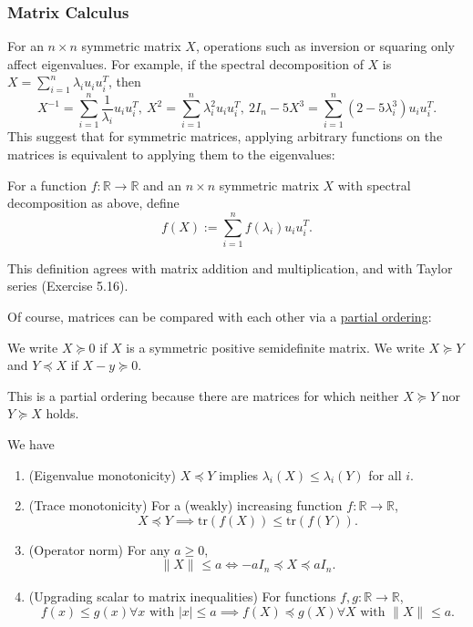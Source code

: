 \subsubsection{Matrix Calculus}
For an $n \times n$ symmetric matrix $X$, operations such as inversion or squaring only affect eigenvalues. 
For example, if the spectral decomposition of $X$ is $X = \sum_{i = 1}^{n} \lambda_i u_iu_i^T$, then
\[ X^{-1} = \sum_{i = 1}^{n} \frac{1}{\lambda_i}u_iu_i^T, \ 
X^2 = \sum_{i = 1}^{n} \lambda_i^2 u_iu_i^T, \ 
2I_n - 5X^3 = \sum_{i = 1}^{n} (2 - 5 \lambda_i^3)u_iu_i^T. \]
This suggest that for symmetric matrices, applying arbitrary functions on the matrices is equivalent to 
applying them to the eigenvalues:

\begin{definition}
\label{def:5.4.2}
For a function $f: \mathbb{R} \to \mathbb{R}$ and an $n \times n$ symmetric matrix $X$ with spectral 
decomposition as above, define 
\[ f(X) := \sum_{i = 1}^{n} f(\lambda_i)u_iu_i^T. \]
\end{definition}
This definition agrees with matrix addition and multiplication, and with Taylor series (Exercise 5.16).

Of course, matrices can be compared with each other via a \underline{partial ordering}:
\begin{definition}[Loewner order]
\label{def:5.4.3}
We write $X \succcurlyeq 0$ if $X$ is a symmetric positive semidefinite matrix. We write $X \succeq Y$ and 
$Y \preceq X$ if $X - y \succeq 0$.
\end{definition}
This is a partial ordering because there are matrices for which neither $X \succeq Y$ nor $Y \succeq X$ holds.

\begin{proposition}
\label{prop:5.4.4}
We have
\begin{enumerate}
	\item (Eigenvalue monotonicity) $X \preceq Y$ implies $\lambda_i(X) \leq \lambda_i(Y)$ for all $i$.
	\item (Trace monotonicity) For a (weakly) increasing function $f: \mathbb{R} \to \mathbb{R}$, 
	\[ X \preceq Y \implies \mathrm{tr}(f(X)) \leq \mathrm{tr}(f(Y)). \]
	\item (Operator norm) For any $a \geq 0$, 
	\[ \lVert X \rVert_{} \leq a \iff -aI_n \preceq X \preceq aI_n. \]
	\item (Upgrading scalar to matrix inequalities) For functions $f, g: \mathbb{R} \to \mathbb{R}$, 
	\[ f(x) \leq g(x) \forall x \text{ with } |x|\leq a \implies 
	f(X) \preceq g(X) \forall X \text{ with } \lVert X \rVert_{} \leq a. \]
\end{enumerate}
\end{proposition}


